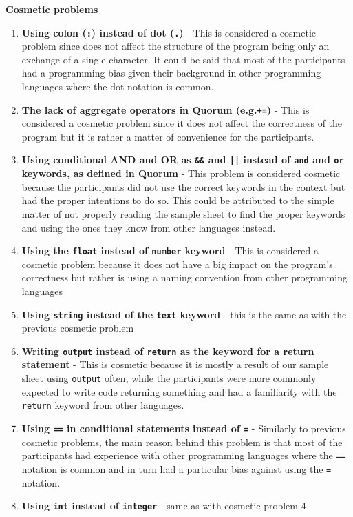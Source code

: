 \textbf{Cosmetic problems}
\begin{enumerate}
\item \textbf{Using colon (\lstinline!:!) instead of dot (\lstinline!.!)} - This is considered a cosmetic problem since does not affect the structure of the program being only an exchange of a single character. It could be said that most of the participants had a programming bias given their background in other programming languages where the dot notation is common.
\item \textbf{The lack of aggregate operators in Quorum (e.g.\lstinline!+=!)} - This is considered a cosmetic problem since it does not affect the correctness of the program but it is rather a matter of convenience for the participants.
\item \textbf{Using conditional AND and OR as \lstinline!&&! and \lstinline!||! instead of \lstinline!and! and \lstinline!or! keywords, as defined in Quorum}  - This problem is considered cosmetic because the participants did not use the correct keywords in the context but had the proper intentions to do so. This could be attributed to the simple matter of not properly reading the sample sheet to find the proper keywords and using the ones they know from other languages instead.
\item \textbf{Using the \lstinline!float! instead of \lstinline!number! keyword} - This is considered a cosmetic problem because it does not have a big impact on the program’s correctness but rather is using a naming convention from other programming languages
\item \textbf{Using \lstinline!string! instead of the \lstinline!text! keyword} - this is the same as with the previous cosmetic problem
\item \textbf{Writing \lstinline!output! instead of \lstinline!return! as the keyword for a return statement} - This is cosmetic because it is mostly a result of our sample sheet using \lstinline!output! often, while the participants were more commonly expected to write code returning something and had a familiarity with the \lstinline!return! keyword from other languages.
\item \textbf{Using \lstinline!==! in conditional statements instead of \lstinline!=!} - Similarly to previous cosmetic problems, the main reason behind this problem is that most of the participants had experience with other programming languages where the \lstinline!==! notation is common and in turn had a particular bias against using the \lstinline!=! notation.
\item \textbf{Using \lstinline!int! instead of \lstinline!integer!}  - same as with cosmetic problem 4

\end{enumerate}
